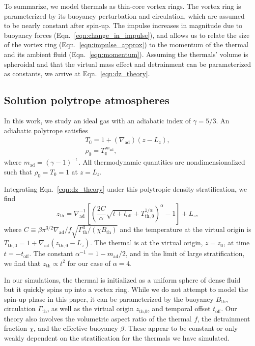 \documentclass[twocolumn, amsmath, amsfonts, amssymb, trackchanges]{aastex62}
\newcommand{\grad}{\ensuremath{\nabla}}
\begin{document}
To summarize, we model thermals as thin-core vortex rings.
The vortex ring is parameterized by its buoyancy perturbation and circulation, which are assumed to be nearly constant after spin-up.
The impulse increases in magnitude due to buoyancy forces (Eqn.~\ref{eqn:change_in_impulse}), and allows us to relate the size of the vortex ring (Eqn.~\ref{eqn:impulse_approx}) to the momentum of the thermal and its ambient fluid (Eqn.~\ref{eqn:momentum}).
Assuming the thermals' volume is spheroidal and that the virtual mass effect and detrainment can be parameterized as constants, we arrive at Eqn.~\ref{eqn:dz_theory}.

\subsection{Solution polytrope atmospheres}
In this work, we study an ideal gas with an adiabatic index of $\gamma = 5/3$.
An adiabatic polytrope satisfies
\begin{gather}
T_0 = 1 + (\grad_{\text{ad}})(z - L_z), \\
\rho_0 = T_0^{\,m_{\text{ad}}},
\label{eqn:polytrope}
\end{gather}
where $m_{\text{ad}} = (\gamma-1)^{-1}$.
All thermodynamic quantities are nondimensionalized such that $\rho_0 = T_0 = 1$ at $z = L_z$.
 
Integrating Eqn.~\ref{eqn:dz_theory} under this polytropic density stratification, we find
\begin{equation}
z_{\text{th}} = \grad_{\text{ad}}^{-1}\left[\left(\frac{2C}{ \alpha } \sqrt{t + t_{\text{off}}} + T_{\text{th},0}^{1/\alpha}  \right)^{\alpha} - 1\right] + L_z,
\label{eqn:theory_z}
\end{equation}
where $C \equiv \beta \pi^{3/2} \grad_{\text{ad}} / f \sqrt{\Gamma_{\text{th}}^3/(\chi B_{\text{th}})}$ and the temperature at the virtual origin is $T_{\text{th},0} = 1 + \grad_{\text{ad}}(z_{\text{th},0} - L_z)$.
The thermal is at the virtual origin, $z=z_0$, at time $t=-t_{\text{off}}$.
The constant $\alpha^{-1} = 1 - m_{\text{ad}}/2$, and in the limit of large stratification, we find that $z_{\text{th}} \propto t^2$ for our case of $\alpha = 4$. 

In our simulations, the thermal is initialized as a uniform sphere of dense fluid but it quickly spins up into a vortex ring. 
While we do not attempt to model the spin-up phase in this paper, it can be parameterized by the buoyancy $B_{\text{th}}$, circulation $\Gamma_{\text{th}}$, as well as the virtual origin $z_{\text{th,0}}$, and temporal offset $t_{\text{off}}$. 
Our theory also involves the volumetric aspect ratio of the thermal $f$, the detrainment fraction $\chi$, and the effective buoyancy $\beta$. 
These appear to be constant or only weakly dependent on the stratification for the thermals we have simulated.
\end{document}

